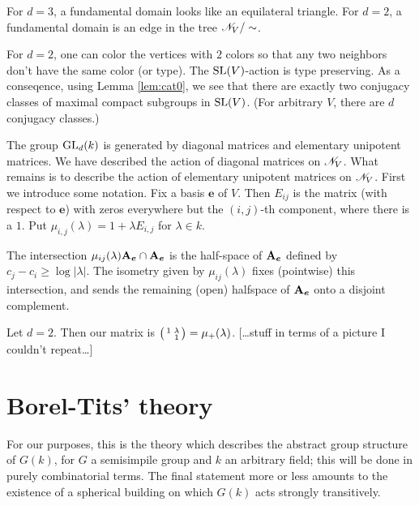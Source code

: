 \documentclass{article}
\begin{document}
For $d=3$, a fundamental domain looks like an equilateral triangle. For 
$d=2$, a fundamental domain is an edge in the tree 
$\mathscr{N}_V/\sim$. 

For $d=2$, one can color the vertices with $2$ colors so that any two neighbors 
don't have the same color (or type). The 
$\operatorname{SL}(V)$-action is type preserving. As a conseqence, using 
Lemma \ref{lem:cat0}, we see that there are exactly two conjugacy classes of 
maximal compact subgroups in $\operatorname{SL}(V)$. (For arbitrary $V$, there are 
$d$ conjugacy classes.) 

The group $\operatorname{GL}_d(k)$ is generated by diagonal matrices and elementary 
unipotent matrices. We have described the action of diagonal matrices on 
$\mathscr{N}_V$. What remains is to describe the action of elementary unipotent matrices 
on $\mathscr{N}_V$. First we introduce some notation. Fix a basis 
$\boldsymbol e$ of $V$. Then $E_{i j}$ is the matrix (with respect to 
$\boldsymbol e$) with zeros everywhere but the $(i,j)$-th component, where there 
is a $1$. Put $\mu_{i,j}(\lambda) = 1+\lambda E_{i,j}$ for 
$\lambda\in k$. 

\begin{proposition}
The intersection 
$\mu_{i j}(\lambda) \mathbf{A}_{\boldsymbol e} \cap \mathbf{A}_{\boldsymbol e}$ is the half-space 
of $\mathbf{A}_{\boldsymbol e}$ defined by 
$c_j-c_i \geqslant \log |\lambda|$. The isometry given by 
$\mu_{i j}(\lambda)$ fixes (pointwise) this intersection, and sends the remaining 
(open) halfspace of $\mathbf{A}_{\boldsymbol e}$ onto a disjoint complement. 
\end{proposition}

\begin{example}
Let $d=2$. Then our matrix is $\bigl(\begin{smallmatrix} 1 & \lambda \\  & 1 \end{smallmatrix} \bigr) = \mu_+(\lambda)$. 
[\ldots stuff in terms of a picture I couldn't repeat\ldots]
\end{example}





\section{Borel-Tits' theory}

For our purposes, this is the theory which describes the abstract group structure 
of $G(k)$, for $G$ a semisimpile group and $k$ an arbitrary field; this will be done in 
purely combinatorial terms. The final statement more or less amounts to the existence 
of a spherical building on which $G(k)$ acts strongly transitively. 
\end{document}
